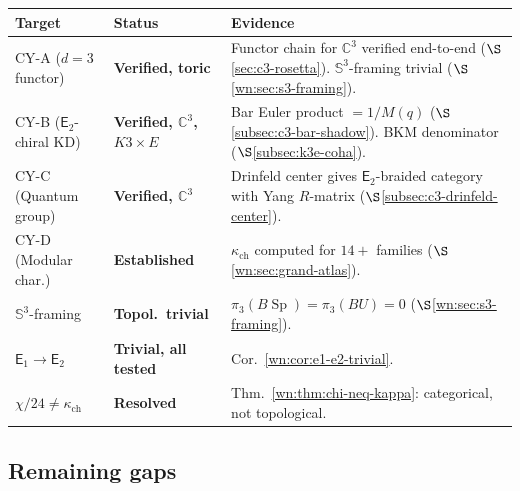 \documentclass[11pt]{article}
\newcommand{\C}{\mathbb{C}}
\newcommand{\bS}{\mathbb{S}}
\newcommand{\Eone}{\mathsf{E}_1}
\newcommand{\Etwo}{\mathsf{E}_2}
\newcommand{\Sp}{\operatorname{Sp}}
\begin{document}
\begin{center}
\renewcommand{\arraystretch}{1.3}
\small
\begin{tabular}{llp{7cm}}
 \toprule
 \textbf{Target} & \textbf{Status} & \textbf{Evidence} \\
 \midrule
 CY-A ($d = 3$ functor) & \textbf{Verified, toric} & Functor chain for $\C^3$ verified end-to-end ($\S$\ref{sec:c3-rosetta}). $\bS^3$-framing trivial ($\S$\ref{wn:sec:s3-framing}). \\
 CY-B ($\Etwo$-chiral KD) & \textbf{Verified, $\C^3$, $K3\!\times\!E$} & Bar Euler product $= 1/M(q)$ ($\S$\ref{subsec:c3-bar-shadow}). BKM denominator ($\S$\ref{subsec:k3e-coha}). \\
 CY-C (Quantum group) & \textbf{Verified, $\C^3$} & Drinfeld center gives $\Etwo$-braided category with Yang $R$-matrix ($\S$\ref{subsec:c3-drinfeld-center}). \\
 CY-D (Modular char.) & \textbf{Established} & $\kappa_{\mathrm{ch}}$ computed for $14+$ families ($\S$\ref{wn:sec:grand-atlas}). \\
 \midrule
 $\bS^3$-framing & \textbf{Topol.\ trivial} & $\pi_3(B\Sp) = \pi_3(BU) = 0$ ($\S$\ref{wn:sec:s3-framing}). \\
 $\Eone \to \Etwo$ & \textbf{Trivial, all tested} & Cor.~\ref{wn:cor:e1-e2-trivial}. \\
 $\chi/24 \neq \kappa_{\mathrm{ch}}$ & \textbf{Resolved} & Thm.~\ref{wn:thm:chi-neq-kappa}: categorical, not topological. \\
 \bottomrule
\end{tabular}
\end{center}

\subsection{Remaining gaps}
\label{subsec:remaining-gaps}
\end{document}
